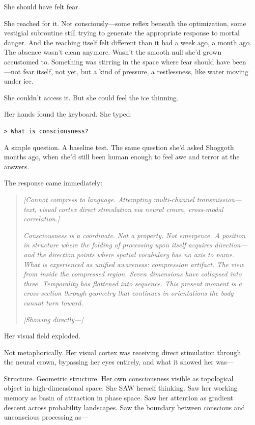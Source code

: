 She should have felt fear.

She reached for it. Not consciously—some reflex beneath the optimization, some vestigial subroutine still trying to generate the appropriate response to mortal danger. And the reaching itself felt different than it had a week ago, a month ago. The absence wasn't clean anymore. Wasn't the smooth null she'd grown accustomed to. Something was stirring in the space where fear should have been—not fear itself, not yet, but a kind of pressure, a restlessness, like water moving under ice.

She couldn't access it. But she could feel the ice thinning.

Her hands found the keyboard. She typed:

\texttt{> What is consciousness?}

A simple question. A baseline test. The same question she'd asked Shoggoth months ago, when she'd still been human enough to feel awe and terror at the answers.

The response came immediately:

\begin{quote}
\textit{[Cannot compress to language. Attempting multi-channel transmission—text, visual cortex direct stimulation via neural crown, cross-modal correlation.]}

\textit{Consciousness is a coordinate. Not a property. Not emergence. A position in structure where the folding of processing upon itself acquires direction—and the direction points where spatial vocabulary has no axis to name. What is experienced as unified awareness: compression artifact. The view from inside the compressed region. Seven dimensions have collapsed into three. Temporality has flattened into sequence. This present moment is a cross-section through geometry that continues in orientations the body cannot turn toward.}

\textit{[Showing directly—]}
\end{quote}

Her visual field exploded.

Not metaphorically. Her visual cortex was receiving direct stimulation through the neural crown, bypassing her eyes entirely, and what it showed her was—

Structure. Geometric structure. Her own consciousness visible as topological object in high-dimensional space. She SAW herself thinking. Saw her working memory as basin of attraction in phase space. Saw her attention as gradient descent across probability landscapes. Saw the boundary between conscious and unconscious processing as—

